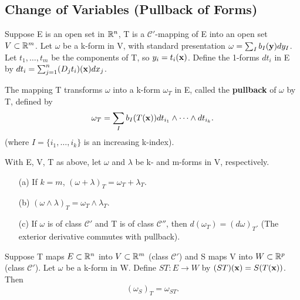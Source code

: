 

\subsection*{Change of Variables (Pullback of Forms)}
\label{sec:chap10:pullback_forms}

Suppose E is an open set in $\mathbb{R}^n$, T is a $\mathcal{C}'$-mapping of
E into an open set $V \subset \mathbb{R}^m$. Let $\omega$ be a k-form in V,
with standard presentation $\omega = \sum_I b_I(\mathbf{y}) dy_I$. Let
$t_1, \dots, t_m$ be the components of T, so $y_i = t_i(\mathbf{x})$.
Define the 1-forms $dt_i$ in E by $dt_i = \sum_{j=1}^n (D_j
t_i)(\mathbf{x}) dx_j$.

The mapping T transforms $\omega$ into a k-form $\omega_T$ in E,
called the \textbf{pullback} of $\omega$ by T, defined by
\[
  \omega_T = \sum_I b_I(T(\mathbf{x})) dt_{i_1} \wedge \dots \wedge dt_{i_k}.
\]
(where $I = \{ i_1, \dots, i_k \}$ is an increasing k-index).

\begin{theorem}
  \label{thm:chap10:pullback_properties}
  With E, V, T as above, let $\omega$ and $\lambda$ be k- and m-forms
  in V, respectively.
  \begin{enumerate}
    \item[(a)] If $k=m$, $(\omega + \lambda)_T = \omega_T + \lambda_T$.
    \item[(b)] $(\omega \wedge \lambda)_T = \omega_T \wedge \lambda_T$.
    \item[(c)] If $\omega$ is of class $\mathcal{C}'$ and T is of
      class $\mathcal{C}''$, then $d(\omega_T) = (d\omega)_T$. (The
      exterior derivative commutes with pullback).
  \end{enumerate}
\end{theorem}

\begin{theorem}
  \label{thm:chap10:pullback_composition}
  Suppose T maps $E \subset \mathbb{R}^n$ into $V \subset \mathbb{R}^m$ (class
  $\mathcal{C}'$) and S maps V into $W \subset \mathbb{R}^p$ (class
  $\mathcal{C}'$). Let $\omega$ be a k-form in W. Define $ST: E \to
  W$ by $(ST)(\mathbf{x}) = S(T(\mathbf{x}))$. Then
  \[
    (\omega_S)_T = \omega_{ST}.
  \]
\end{theorem}

